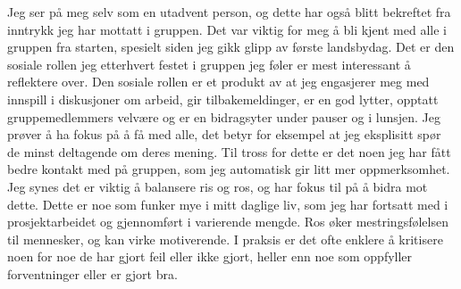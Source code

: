 

Jeg ser på meg selv som en utadvent person, og dette har også blitt bekreftet fra inntrykk jeg har mottatt i gruppen. Det var viktig for meg å bli kjent med alle i gruppen fra starten, spesielt siden jeg gikk glipp av første landsbydag. Det er den sosiale rollen jeg etterhvert festet i gruppen jeg føler er mest interessant å reflektere over. Den sosiale rollen er et produkt av at jeg engasjerer meg med innspill i diskusjoner om arbeid, gir tilbakemeldinger, er en god lytter, opptatt gruppemedlemmers velvære og er en bidragsyter under pauser og i lunsjen. Jeg prøver å ha fokus på å få med alle, det betyr for eksempel at jeg eksplisitt spør de minst deltagende om deres mening. Til tross for dette er det noen jeg har fått bedre kontakt med på gruppen, som jeg automatisk gir litt mer oppmerksomhet. Jeg synes det er viktig å balansere ris og ros, og har fokus til på å bidra mot dette. Dette er noe som funker mye i mitt daglige liv, som jeg har fortsatt med i prosjektarbeidet og gjennomført i varierende mengde. Ros øker mestringsfølelsen til mennesker, og kan virke motiverende. I praksis er det ofte enklere å kritisere noen for noe de har gjort feil eller ikke gjort, heller enn noe som oppfyller forventninger eller er gjort bra.

